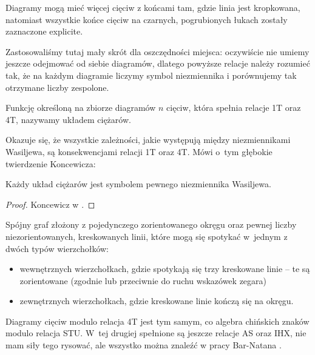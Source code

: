 Diagramy mogą mieć więcej cięciw z końcami tam, gdzie linia jest kropkowana, natomiast wszystkie końce cięciw na czarnych, pogrubionych łukach zostały zaznaczone explicite.

Zastosowaliśmy tutaj mały skrót dla oszczędności miejsca: oczywiście nie umiemy jeszcze odejmować od siebie diagramów, dlatego powyższe relacje należy rozumieć tak, że na każdym diagramie liczymy symbol niezmiennika i porównujemy tak otrzymane liczby zespolone.

\begin{definition}
    Funkcję określoną na zbiorze diagramów $n$ cięciw, która spełnia relacje 1T oraz 4T, nazywamy układem ciężarów.
\end{definition}

Okazuje się, że wszystkie zależności, jakie występują między niezmiennikami Wasiljewa, są konsekwencjami relacji 1T oraz 4T.
Mówi o~tym głębokie twierdzenie Koncewicza:

\begin{proposition}
    Każdy układ ciężarów jest symbolem pewnego niezmiennika Wasiljewa. %
\end{proposition}

\begin{proof}
    Koncewicz w \cite{kontsevich93}. %
\end{proof}

\begin{definition}
    Spójny graf złożony z pojedynczego zorientowanego okręgu oraz pewnej liczby niezorientowanych, kreskowanych linii, które mogą się spotykać w~jednym z dwóch typów wierzchołków:
    \begin{itemize}
        \item wewnętrznych wierzchołkach, gdzie spotykają się trzy kreskowane linie -- te są zorientowane (zgodnie lub przeciwnie do ruchu wskazówek zegara)
        \item zewnętrznych wierzchołkach, gdzie kreskowane linie kończą się na okręgu.
    \end{itemize}
\end{definition}

Diagramy cięciw modulo relacja 4T jest tym samym, co algebra chińskich znaków modulo relacja STU.
W~tej drugiej spełnione są jeszcze relacje AS oraz IHX, nie mam siły tego rysować, ale wszystko można znaleźć w pracy Bar-Natana \cite{barnatan_95}.

